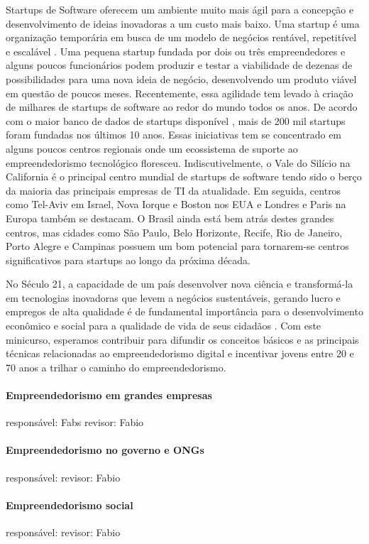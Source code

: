 Startups de Software oferecem um ambiente muito mais ágil para a concepção e desenvolvimento de ideias inovadoras a um custo mais baixo. Uma startup é uma organização temporária em busca de um modelo de negócios rentável, repetitível e escalável
\cite{Blank2012}. Uma pequena startup fundada por dois ou três empreendedores e alguns poucos funcionários podem produzir e testar a viabilidade de dezenas de possibilidades para uma nova ideia de negócio, desenvolvendo um produto viável em questão de poucos meses. Recentemente, essa agilidade tem levado à criação de milhares de startups de software ao redor do mundo todos os anos. De acordo com o maior banco de dados de startups disponível \cite{crunchbase:2014}, mais de 200 mil startups foram fundadas nos últimos 10 anos. Essas iniciativas tem se concentrado em alguns poucos centros regionais onde um ecossistema de suporte ao empreendedorismo tecnológico floresceu. Indiscutivelmente, o Vale do Silício na California é o principal centro mundial de startups de software tendo sido o berço da maioria das principais empresas de TI da atualidade. Em seguida, centros como Tel-Aviv em Israel, Nova Iorque e Boston nos EUA e Londres e Paris na Europa também se destacam. O Brasil ainda está bem atrás destes grandes centros, mas cidades como São Paulo, Belo Horizonte, Recife, Rio de Janeiro, Porto Alegre e Campinas possuem um bom potencial para tornarem-se centros significativos para startups ao longo da próxima década.

No Século 21, a capacidade de um país desenvolver nova ciência e transformá-la em tecnologias inovadoras que levem a negócios sustentáveis, gerando lucro e empregos de alta qualidade é de fundamental importância para o desenvolvimento econômico e social  para a qualidade de vida de seus cidadãos \cite{unece:2012}. Com este minicurso, esperamos contribuir para difundir os conceitos básicos e as principais técnicas relacionadas ao empreendedorismo digital e incentivar jovens entre 20 e 70 anos a trilhar o caminho do empreendedorismo.


\paragraph{Empreendedorismo em grandes empresas}
responsável: Fabs revisor: Fabio

\paragraph{Empreendedorismo no governo e ONGs}
responsável: revisor: Fabio

\paragraph{Empreendedorismo social}
responsável: revisor: Fabio
